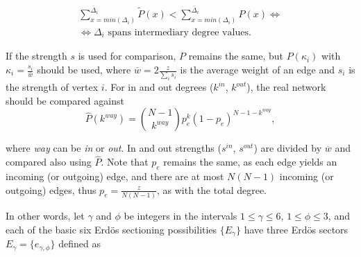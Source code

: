\documentclass[%
	aip,
	jmp,%
	amsmath,amssymb,
	reprint,%
]{revtex4-1}
\begin{document}
																																																																																\begin{equation}\label{criterio2}
																																																																																	\begin{split}
																																																																																		\sum_{x=min(\Delta_i)}^{\overline{\Delta}_i} \widetilde{P}(x) < \sum_{x=min(\Delta_i)}^{\overline{\Delta}_i} P(x) \Leftrightarrow \\
																																																																																		\Leftrightarrow \Delta_i \text{ spans intermediary degree values.}
																																																																																	\end{split}
																																																																																\end{equation}

																																																																																If the strength $s$ is used for comparison, $P$ remains the same, but $P(\kappa_i)$ with $\kappa_i=\frac{s_i}{\overline{w}}$ should be used, where $\overline{w}=2\frac{z}{\sum_is_i}$ is the average weight of an edge and $s_i$ is the strength of vertex $i$. For in and out degrees ($k^{in}$, $k^{out}$), the real network should be compared against
																																																																																\begin{equation}
																																																																																	\hat{P}(k^{way})=\binom{N-1}{k^{way}}p_e^k(1-p_e)^{N-1-k^{way}},
																																																																																\end{equation}

																																																																																\noindent where \emph{way} can be \emph{in} or \emph{out}. In and out strengths ($s^{in}$, $s^{out}$) are divided by $\overline{w}$ and compared also using $\hat{P}$. Note that $p_e$ remains the same, as each edge yields an incoming (or outgoing) edge, and there are at most $N(N-1)$ incoming (or outgoing) edges, thus $p_e=\frac{z}{N(N-1)}$, as with the total degree.

																																																																																In other words, let $\gamma$ and $\phi$ be integers in the intervals $1 \leq \gamma \leq 6$, $1 \leq \phi \leq 3$, and each of the basic six Erd\"os sectioning possibilities $\{E_{\gamma}\}$ have three Erd\"os sectors $E_{\gamma}= \{e_{\gamma, \phi} \}$ defined as
\end{document}
